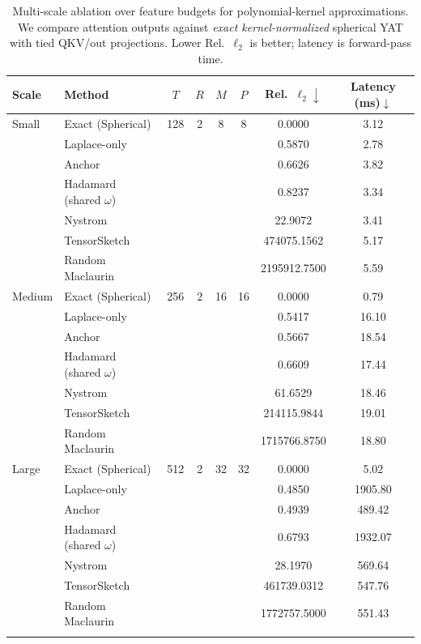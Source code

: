 \documentclass{article}
\begin{document}
\begin{table}[t]
\centering
\small
\caption{Multi-scale ablation over feature budgets for polynomial-kernel approximations. We compare attention outputs against \emph{exact kernel-normalized} spherical YAT with tied QKV/out projections. Lower Rel.~$\ell_2$ is better; latency is forward-pass time.}
\label{tab:poly-sweep}
\begin{tabular}{llcccccc}
\toprule
Scale & Method & $T$ & $R$ & $M$ & $P$ & Rel.~$\ell_2\downarrow$ & Latency (ms)$\downarrow$\\
\midrule
Small & Exact (Spherical) & 128 & 2 & 8 & 8 & 0.0000 & 3.12\\
 & Laplace-only &  &  &  &  & 0.5870 & 2.78\\
 & Anchor &  &  &  &  & 0.6626 & 3.82\\
 & Hadamard (shared $\omega$) &  &  &  &  & 0.8237 & 3.34\\
 & Nystrom &  &  &  &  & 22.9072 & 3.41\\
 & TensorSketch &  &  &  &  & 474075.1562 & 5.17\\
 & Random Maclaurin &  &  &  &  & 2195912.7500 & 5.59\\
\addlinespace
Medium & Exact (Spherical) & 256 & 2 & 16 & 16 & 0.0000 & 0.79\\
 & Laplace-only &  &  &  &  & 0.5417 & 16.10\\
 & Anchor &  &  &  &  & 0.5667 & 18.54\\
 & Hadamard (shared $\omega$) &  &  &  &  & 0.6609 & 17.44\\
 & Nystrom &  &  &  &  & 61.6529 & 18.46\\
 & TensorSketch &  &  &  &  & 214115.9844 & 19.01\\
 & Random Maclaurin &  &  &  &  & 1715766.8750 & 18.80\\
\addlinespace
Large & Exact (Spherical) & 512 & 2 & 32 & 32 & 0.0000 & 5.02\\
 & Laplace-only &  &  &  &  & 0.4850 & 1905.80\\
 & Anchor &  &  &  &  & 0.4939 & 489.42\\
 & Hadamard (shared $\omega$) &  &  &  &  & 0.6793 & 1932.07\\
 & Nystrom &  &  &  &  & 28.1970 & 569.64\\
 & TensorSketch &  &  &  &  & 461739.0312 & 547.76\\
 & Random Maclaurin &  &  &  &  & 1772757.5000 & 551.43\\
\addlinespace
\bottomrule
\end{tabular}
\end{table}
\end{document}
